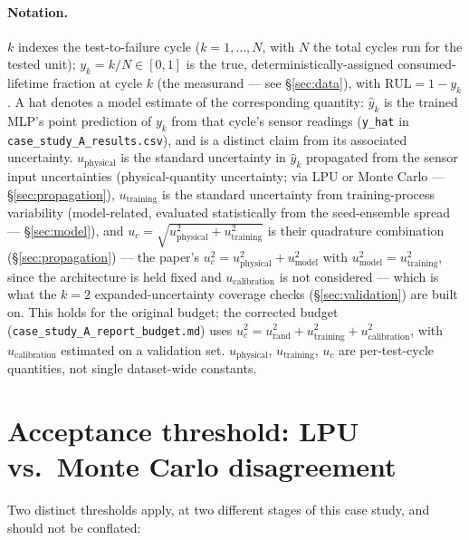 \documentclass[11pt]{article}
\newcommand{\Rul}{\text{RUL}}
\begin{document}
\paragraph{Notation.} $k$ indexes the test-to-failure cycle ($k=1,\dots,N$,
with $N$ the total cycles run for the tested unit); $y_k = k/N \in [0,1]$ is
the true, deterministically-assigned consumed-lifetime fraction at cycle $k$
(the measurand --- see \S\ref{sec:data}), with $\Rul=1-y_k$. A hat denotes a
model estimate of the corresponding quantity: $\hat y_k$ is the trained
MLP's point prediction of $y_k$ from that cycle's sensor readings
(\texttt{y\_hat} in \texttt{case\_\allowbreak study\_\allowbreak A\_\allowbreak results.csv}), and is a distinct
claim from its associated uncertainty. $u_{\mathrm{physical}}$ is the standard uncertainty in
$\hat y_k$ propagated from the sensor input uncertainties (physical-quantity uncertainty; via LPU or
Monte Carlo --- \S\ref{sec:propagation}), $u_{\mathrm{training}}$ is the standard uncertainty
from training-process variability (model-related, evaluated statistically from the seed-ensemble spread ---
\S\ref{sec:model}), and $u_c=\sqrt{u_{\mathrm{physical}}^2+u_{\mathrm{training}}^2}$ is their quadrature
combination (\S\ref{sec:propagation}) --- the paper's $u_c^2=u_{\mathrm{physical}}^2+u_{\mathrm{model}}^2$
with $u_{\mathrm{model}}^2=u_{\mathrm{training}}^2$, since the architecture is held fixed and
$u_{\mathrm{calibration}}$ is not considered --- which is what the $k{=}2$
expanded-uncertainty coverage checks (\S\ref{sec:validation}) are built on.
This holds for the original budget; the corrected budget
(\texttt{case\_\allowbreak study\_\allowbreak A\_\allowbreak report\_\allowbreak budget.md}) uses
$u_c^2=u_{\mathrm{rand}}^2+u_{\mathrm{training}}^2+u_{\mathrm{calibration}}^2$, with
$u_{\mathrm{calibration}}$ estimated on a validation set.
$u_{\mathrm{physical}}$, $u_{\mathrm{training}}$, $u_c$ are per-test-cycle quantities, not single
dataset-wide constants.

\section{Acceptance threshold: LPU vs.\ Monte Carlo disagreement}
\label{sec:threshold}

Two distinct thresholds apply, at two different stages of this case study,
and should not be conflated:
\end{document}
